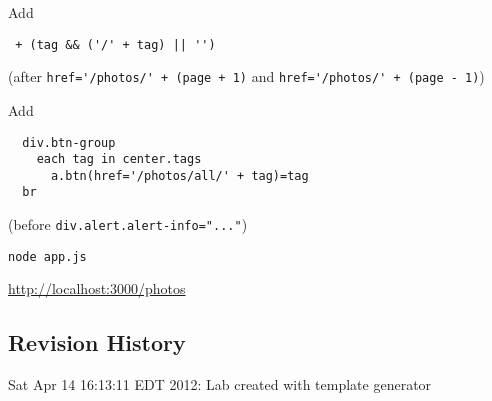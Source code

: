 \documentclass{article}
\begin{document}
Add
\begin{verbatim}
 + (tag && ('/' + tag) || '')
\end{verbatim}
(after \verb!href='/photos/' + (page + 1)! and \verb!href='/photos/' + (page - 1)!)

Add
\begin{verbatim}
  div.btn-group
    each tag in center.tags
      a.btn(href='/photos/all/' + tag)=tag
  br
\end{verbatim}
(before \verb!div.alert.alert-info="..."!) 

\verb!node app.js!

\href{http://localhost:3000/photos}{http://localhost:3000/photos}



\subsection*{Revision History}
\begin{itemize*}
 \item Sat Apr 14 16:13:11 EDT 2012: Lab created with template generator
\end{itemize*}
\end{document}
